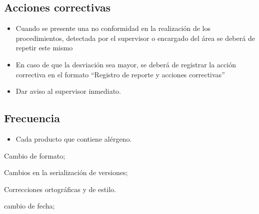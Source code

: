 \subsection{Acciones correctivas}
\begin{itemize}
	\item Cuando se presente una no conformidad en la realización de los procedimientos, detectada por el supervisor o encargado del área se deberá de repetir este mismo
	\item En caso de que la desviación sea mayor, se deberá de registrar la acción correctiva en el formato “Registro de reporte y acciones correctivas”
	\item Dar aviso al supervisor inmediato.
\end{itemize}

\subsection{Frecuencia}
\begin{itemize}
	\item Cada producto que contiene alérgeno.
\end{itemize}

\begin{changelog}[title=Registro de cambios,simple, sectioncmd=\subsection*,label=changelog-\thesection-\MayorVer.\MenorVer]
	\begin{version}[v=\MayorVer.\MenorVer, date=2023--01, author=Pablo E. Alanis]
		\item Cambio de formato;
		\item Cambios en la serialización de versiones;
		\item Correcciones ortográficas y de estilo.
	\end{version}

	\begin{version}[v=1.7, date=2022--05, author=Alonso M.]
		\item cambio de fecha;
	\end{version}

\end{changelog}
